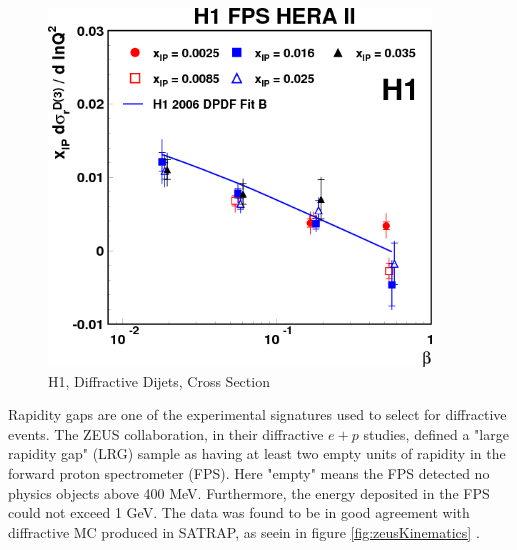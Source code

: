 \begin{figure}[h!]
\begin{centering}
\includegraphics[width=4in]{Chapter2/importfigs/d10-095f15.png}
\par\end{centering}
\caption{H1, Diffractive Dijets, Cross Section \cite{Aaron:2010aa} \label{fig:h1XSec}}
\end{figure}

Rapidity gaps are one of the experimental signatures used to select for diffractive events. The ZEUS collaboration, in their diffractive $e+p$ studies, defined a "large rapidity gap" (LRG) sample as having at least two empty units of rapidity in the forward proton spectrometer (FPS). Here "empty" means the FPS detected no physics objects above 400 MeV. Furthermore, the energy deposited in the FPS could not exceed 1 GeV. The data was found to be in good agreement with diffractive MC produced in SATRAP, as seein in figure \ref{fig:zeusKinematics} \cite{Chekanov:2008fh}. 

